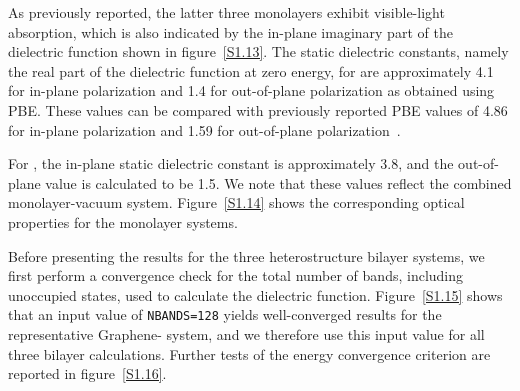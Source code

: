 As previously reported, the latter three monolayers exhibit visible-light absorption,
which is also indicated by the in-plane imaginary part of the dielectric function shown in figure~\ref{S1.13}.
The static dielectric constants, namely the real part of the dielectric function at zero energy,
for  are approximately 4.1 for in-plane polarization and 1.4 for out-of-plane polarization as obtained using PBE.
These values can be compared with previously reported PBE values of 4.86 for in-plane polarization and 1.59 for out-of-plane polarization~\cite{mortazavi2019outstanding}.

For , the in-plane static dielectric constant is approximately 3.8,
and the out-of-plane value is calculated to be 1.5.
We note that these values reflect the combined monolayer-vacuum system.
Figure~\ref{S1.14} shows the corresponding optical properties for the monolayer systems.

Before presenting the results for the three heterostructure bilayer systems,
we first perform a convergence check for the total number of bands, including unoccupied states, used to calculate the dielectric function.
Figure~\ref{S1.15} shows that an input value of \texttt{NBANDS=128} yields well-converged results for the representative Graphene- system,
and we therefore use this input value for all three bilayer calculations.
Further tests of the energy convergence criterion are reported in figure~\ref{S1.16}.

